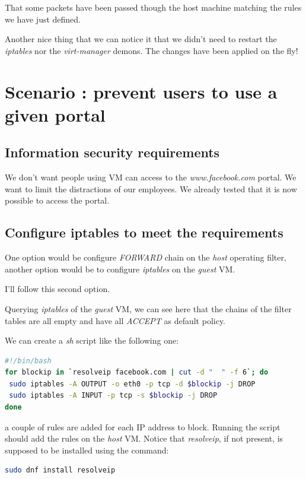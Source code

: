 \documentclass{article}
\begin{document}
That some packets have been passed though the host machine
matching the rules we have just defined.

Another nice thing that we can notice it that we didn't need to restart the \emph{iptables}
nor the \emph{virt-manager} demons.
The changes have been applied on the fly!

\section{Scenario : prevent users to use a given portal}

\subsection{Information security requirements}

We don't want people using VM can access to the \emph{www.facebook.com}
portal. We want to limit the distractions of our employees.
We already tested that it is now possible to access the portal.

\subsection{Configure iptables to meet the requirements}

One option would be configure \emph{FORWARD} chain on
the \emph{host} operating filter, another option would be to
configure \emph{iptables} on the \emph{guest} VM.

I'll follow this second option.

Querying \emph{iptables} of the \emph{guest} VM,
we can see here that the chains of the filter tables are all empty
and have all \emph{ACCEPT} as default policy.

We can create a \emph{sh} script like the following one:

\begin{lstlisting}[language=bash]
#!/bin/bash
for blockip in `resolveip facebook.com | cut -d "  " -f 6`; do
 sudo iptables -A OUTPUT -o eth0 -p tcp -d $blockip -j DROP
 sudo iptables -A INPUT -p tcp -s $blockip -j DROP
done
\end{lstlisting}

a couple of rules are added for each IP address to block.
Running the script should add the rules on the \emph{host} VM.
Notice that \emph{resolveip}, if not present, is supposed to be installed using the command:

\begin{lstlisting}[language=bash]
	sudo dnf install resolveip
\end{lstlisting}
\end{document}
